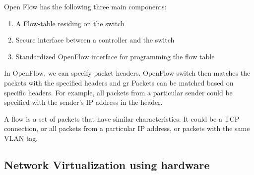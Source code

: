 Open Flow has the following three main components:
\begin{enumerate}
    \item A Flow-table residing on the switch
    \item Secure interface between a controller and the switch
    \item Standardized OpenFlow interface for programming the flow table
\end{enumerate}



In OpenFlow, we can specify packet headers. OpenFlow switch then matches the 
packets with the specified headers and gr
Packets can be matched based on specific headers. For example, all packets from
a particular sender could be specified with the sender's IP address in the header. 

A flow is a set of packets that have similar characteristics. It could be a 
TCP connection, or all packets from a particular IP address, or packets 
with the same VLAN tag. 





\subsection{Network Virtualization using hardware}
